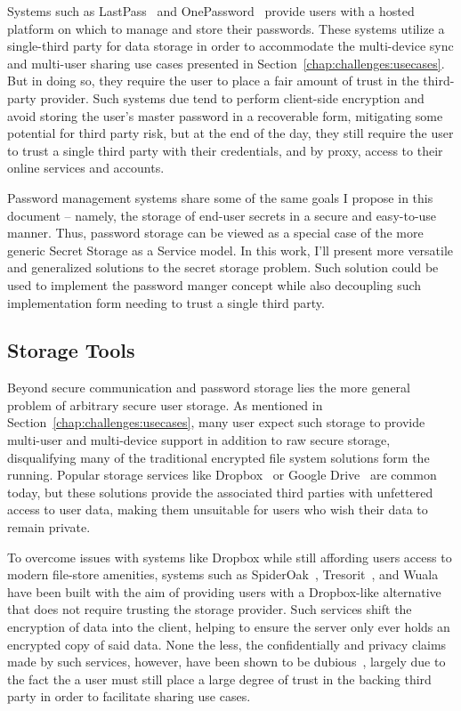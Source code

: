 Systems such as LastPass~\cite{lastpass} and
OnePassword~\cite{onepassword} provide users with a hosted platform on
which to manage and store their passwords. These systems utilize a
single-third party for data storage in order to accommodate the
multi-device sync and multi-user sharing use cases presented in
Section~\ref{chap:challenges:usecases}. But in doing so, they require
the user to place a fair amount of trust in the third-party
provider. Such systems due tend to perform client-side encryption and
avoid storing the user's master password in a recoverable form,
mitigating some potential for third party risk, but at the end of the
day, they still require the user to trust a single third party with
their credentials, and by proxy, access to their online services and
accounts.

Password management systems share some of the same goals I propose in
this document -- namely, the storage of end-user secrets in a secure
and easy-to-use manner. Thus, password storage can be viewed as a
special case of the more generic Secret Storage as a Service model. In
this work, I'll present more versatile and generalized solutions to
the secret storage problem. Such solution could be used to implement
the password manger concept while also decoupling such implementation
form needing to trust a single third party.

\subsection{Storage Tools}

Beyond secure communication and password storage lies the more general
problem of arbitrary secure user storage. As mentioned in
Section~\ref{chap:challenges:usecases}, many user expect such storage
to provide multi-user and multi-device support in addition to raw
secure storage, disqualifying many of the traditional encrypted file
system solutions form the running. Popular storage services like
Dropbox~\cite{dropbox} or Google Drive~\cite{google-drive} are common
today, but these solutions provide the associated third parties with
unfettered access to user data, making them unsuitable for users who
wish their data to remain private.

To overcome issues with systems like Dropbox while still affording
users access to modern file-store amenities, systems such as
SpiderOak~\cite{spideroak}, Tresorit~\cite{tresorit}, and
Wuala~\cite{wuala} have been built with the aim of providing users
with a Dropbox-like alternative that does not require trusting the
storage provider. Such services shift the encryption of data into the
client, helping to ensure the server only ever holds an encrypted copy
of said data. None the less, the confidentially and privacy claims
made by such services, however, have been shown to be
dubious~\cite{Wilson2014}, largely due to the fact the a user must
still place a large degree of trust in the backing third party in
order to facilitate sharing use cases.

